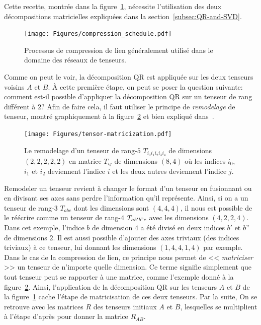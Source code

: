 Cette recette, montrée dans la figure~\ref{fig:compression-schedule}, nécessite l'utilisation des deux décompositions matricielles expliquées dans la section~\ref{subsec:QR-and-SVD}.
\begin{figure}[h]
    \centering
    \texttt{[image: Figures/compression\_schedule.pdf]}
    \caption{Processus de compression de lien généralement utilisé dans le domaine des réseaux de tenseurs.}
    \label{fig:compression-schedule}
\end{figure}
Comme on peut le voir, la décomposition QR est appliquée sur les deux tenseurs voisins $A$ et $B$.
À cette première étape, on peut se poser la question suivante: comment est-il possible d'appliquer la décomposition QR sur un tenseur de rang différent à $2$?
Afin de faire cela, il faut utiliser le principe de \emph{remodelage} de tenseur, montré graphiquement à la figure~\ref{fig:tensor-reshape} et bien expliqué dans~\cite{baker2021methodes}.
\begin{figure}[h]
    \centering
    \texttt{[image: Figures/tensor-matricization.pdf]}
    \caption[Le remodelage d'un tenseur de rang-$5$ à un tenseur de rang-$2$.]{Le remodelage d'un tenseur de rang-$5$ $T_{i_0i_1i_2i_3i_4}$ de dimensions $(2, 2, 2, 2, 2)$ en matrice $T_{ij}$ de dimensions $(8, 4)$ où les indices $i_0$, $i_1$ et $i_2$ deviennent l'indice $i$ et les deux autres deviennent l'indice $j$.}
    \label{fig:tensor-reshape}
\end{figure}
Remodeler un tenseur revient à changer le format d'un tenseur en fusionnant ou en divisant ses axes sans perdre l'information qu'il représente.
Ainsi, si on a un tenseur de rang-$3$ $T_{abc}$ dont les dimensions sont $(4,4,4)$, il nous est possible de le réécrire comme un tenseur de rang-$4$ $T_{ab'b"c}$  avec les dimensions $(4,2,2,4)$.
Dans cet exemple, l'indice $b$ de dimension $4$ a été divisé en deux indices $b'$ et $b"$ de dimensions $2$.
Il est aussi possible d'ajouter des axes triviaux (des indices triviaux) à ce tenseur, lui donnant les dimensions $(1,4,4,1,4)$ par exemple.
Dans le cas de la compression de lien, ce principe nous permet de << \textit{matriciser} >> un tenseur de n'importe quelle dimension.
Ce terme signifie simplement que tout tenseur peut se rapporter à une matrice, comme l'exemple donné à la figure~\ref{fig:tensor-reshape}.
Ainsi, l'application de la décomposition QR sur les tenseurs $A$ et $B$ de la figure~\ref{fig:compression-schedule} cache l'étape de matricisation de ces deux tenseurs.
Par la suite, On se retrouve avec les matrices $R$ des tenseurs initiaux $A$ et $B$, lesquelles se multiplient à l'étape d'après pour donner la matrice $R_{AB}$.
